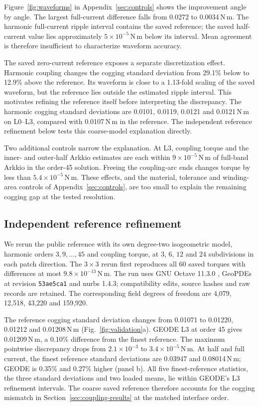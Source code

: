 \documentclass{anvil-paper}
\begin{document}
Figure~\ref{fig:waveforms} in Appendix~\ref{sec:controls} shows the improvement angle by angle. The largest
full-current difference falls from 0.0272 to 0.0034\,N\,m. The harmonic
full-current ripple interval contains the saved reference; the saved half-current
value lies approximately $5\times10^{-5}$\,N\,m below its interval.
Mean agreement is therefore insufficient to characterize waveform accuracy.

The saved zero-current reference exposes a separate discretization effect. Harmonic coupling changes the
cogging standard deviation from 29.1\% below to 12.9\% above the reference.
Its waveform is close to a 1.13-fold scaling of the saved waveform, but the
reference lies outside the estimated ripple interval. This motivates
refining the reference itself before interpreting the discrepancy. The harmonic cogging standard deviations are
0.0101, 0.0119, 0.0121 and 0.0121\,N\,m on L0--L3, compared with
0.0107\,N\,m in the reference. The independent reference refinement below tests this coarse-model
explanation directly.

Two additional controls narrow the explanation. At L3, coupling torque
and the inner- and outer-half Arkkio estimates are each within
$9\times10^{-5}$\,N\,m of full-band Arkkio in the order-45 solution.
Freeing the coupling-arc ends changes torque by less than
$5.4\times10^{-5}$\,N\,m. These effects, and the material, tolerance and
winding-area controls of Appendix~\ref{sec:controls}, are too small to
explain the remaining cogging gap at the tested resolution.

\subsection{Independent reference refinement}\label{sec:refinement}
We rerun the public reference with its own degree-two isogeometric model,
harmonic orders $3,9,\ldots,45$ and coupling torque, at $3$, $6$, $12$ and
$24$ subdivisions in each patch direction. The $3\times3$ rerun first
reproduces all 60 saved torques with differences at most $9.8\times10^{-13}$\,N\,m.
The run uses GNU Octave 11.3.0 \citep{eaton2026octave}, GeoPDEs
\citep{defalco2011geopdes,vazquez2016geopdes} at revision \texttt{53ae5ca1}
and nurbs 1.4.3; compatibility edits, source hashes and raw records are retained.
The corresponding field degrees of freedom are 4,079, 12,518, 43,220
and 159,920.

The reference cogging standard deviation changes from 0.01071 to 0.01220,
0.01212 and 0.01208\,N\,m (Fig.~\ref{fig:validation}a). GEODE L3 at order
45 gives 0.01209\,N\,m, a 0.10\% difference from the finest reference.
The maximum pointwise discrepancy drops from $2.1\times10^{-3}$ to
$3.4\times10^{-5}$\,N\,m. At half and full current, the finest reference
standard deviations are 0.03947 and 0.08014\,N\,m;
GEODE is 0.35\% and 0.27\% higher (panel b). All five finest-reference
statistics, the three
standard deviations and two loaded means, lie within GEODE's L3
refinement intervals. The coarse saved reference therefore accounts for
the cogging mismatch in Section~\ref{sec:coupling-results} at the matched interface order.
\end{document}

